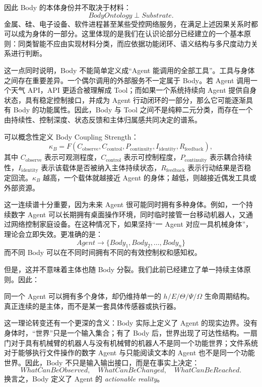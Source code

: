 因此 Body 的本体身份并不取决于材料：
\[
\boxed{
BodyOntology
\perp
Substrate.
}
\]
金属、硅、电子设备、软件进程甚至某些受控网络服务，在满足上述因果关系时都可以成为身体的一部分。这里体现的是我们在认识论部分已经建立的一个基本原则：同类智能不应由实现材料分类，而应依据功能闭环、语义结构与多尺度动力关系进行判断。

这一点同时说明，Body 不能简单定义成“Agent 能调用的全部工具”。工具与身体之间存在重要差异。一个偶尔调用的外部服务不一定属于 Body。若 Agent 调用一个天气 API，API 更适合被理解成 Tool；而如果一个系统持续向 Agent 提供自身状态，具有稳定控制接口，并成为 Agent 行动闭环的一部分，那么它可能逐渐具有 Body 的功能属性。因此，Body 与 Tool 之间不是纯粹二元分类，而存在一个由持续性、控制深度、状态反馈和主体归属感共同决定的谱系。

可以概念性定义 Body Coupling Strength：
\[
\kappa_B
=
F
\left(
C_{\mathrm{observe}},
C_{\mathrm{control}},
P_{\mathrm{continuity}},
I_{\mathrm{identity}},
R_{\mathrm{feedback}}
\right),
\]
其中 $C_{\mathrm{observe}}$ 表示可观测程度，$C_{\mathrm{control}}$ 表示可控制程度，$P_{\mathrm{continuity}}$ 表示耦合持续性，$I_{\mathrm{identity}}$ 表示该载体是否被纳入主体持续状态，$R_{\mathrm{feedback}}$ 表示行动结果是否稳定回流。$\kappa_B$ 越高，一个载体就越接近 Agent 的身体；越低，则越接近偶发工具或外部资源。

这一连续谱十分重要，因为未来 Agent 很可能同时拥有多种身体。例如，一个持续数字 Agent 可以长期拥有桌面操作环境，同时临时接管一台移动机器人，又通过网络控制家庭设备。在这种情况下，如果坚持“一 Agent 对应一具机械身体”，理论会立即失效。更准确的是：
\[
\boxed{
Agent
\rightarrow
\{Body_1,Body_2,\ldots,Body_n\}
}
\]
而不同 Body 可以在不同时间拥有不同的有效控制权和感知权。

但是，这并不意味着主体也随 Body 分裂。我们此前已经建立了单一持续主体原则。因此：
\begin{statementbox}
\centering
{}
\end{statementbox}
同一个 Agent 可以拥有多个身体，却仍维持单一的 $h/E/\Theta/\Psi/\Omega$ 生命周期结构。真正连续的是主体，而不是某一套具体传感器或执行器。

这一理论转变还有一个更深的含义：Body 实际上定义了 Agent 的现实边界。没有身体时，“世界”只是一个输入集合；有了 Body 后，世界出现了可达性结构。一扇门对于具有机械臂的机器人与没有机械臂的机器人不是同一个功能世界；文件系统对于能够执行文件操作的数字 Agent 与只能阅读文本的 Agent 也不是同一个功能世界。因此，Body 不只是输入输出接口，而是在事实上决定：
\[
\boxed{
WhatCanBeObserved,\quad
WhatCanBeChanged,\quad
WhatCanBeReached.
}
\]
换言之，Body 定义了 Agent 的 \emph{actionable reality}。

